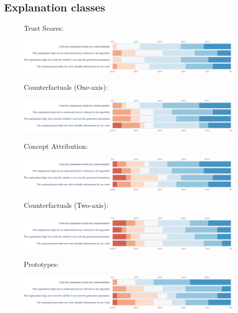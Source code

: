 \subsection{Explanation classes}

\begin{figure}
\centering
\begin{minipage}[c]{0.9\textwidth}
    Trust Scores:
    
    \includegraphics[width=\linewidth]{main/Graphics/4ResultsandAnalysis/0_TrustScores.png}
    
    Counterfactuals (One-axis):
    
    \includegraphics[width=\linewidth]{main/Graphics/4ResultsandAnalysis/1_CounterfactualsOneaxis.png}
    
    Concept Attribution:
    
    \includegraphics[width=\linewidth]{main/Graphics/4ResultsandAnalysis/2_ConceptAttribution.png}
    
    Counterfactuals (Two-axis):
    
    \includegraphics[width=\linewidth]{main/Graphics/4ResultsandAnalysis/3_CounterfactualsTwoaxis.png}
    
    Prototypes:
    
    \includegraphics[width=\linewidth]{main/Graphics/4ResultsandAnalysis/4_Prototypes.png}
    

\end{minipage}
\end{figure}
